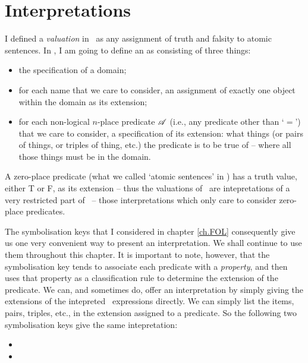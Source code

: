 \section{Interpretations} \label{ss.int}
I defined a \emph{valuation} in \TFL\ as any assignment of truth and falsity to atomic sentences. In \FOL, I am going to define an  as consisting of three things:
	\begin{itemize}	
		\item the specification of a domain;
		\item for each name that we care to consider, an assignment of exactly one object within the domain as its extension;
		\item for each non-logical $n$-place predicate $\mathscr{A}$ (i.e., any predicate other than `$=$') that we care to consider, a specification of its extension: what things (or pairs of things, or triples of thing, etc.) the predicate is to be true of – where all those things must be in the domain.
	\end{itemize}
A zero-place predicate (what we called `atomic sentences' in \TFL) has a truth value, either T or F, as its extension – thus the valuations of \TFL\ are intepretations of a very restricted part of \FOL\ – those interpretations which only care to consider zero-place predicates.

The symbolisation keys that I considered in chapter \ref{ch.FOL} consequently give us one very convenient way to present an interpretation. We shall continue to use them throughout this chapter. It is important to note, however, that the symbolisation key tends to associate each predicate with a \emph{property}, and then uses that property as a classification rule to determine the extension of the predicate. We can, and sometimes do, offer an interpretation by simply giving the extensions of the intepreted \FOL\ expressions directly. We can simply list the items, pairs, triples, etc., in the extension assigned to a predicate. So the following two symbolisation keys give the same intepretation: 
\begin{itemize}
	\item {} 
\item {}

\end{itemize}


